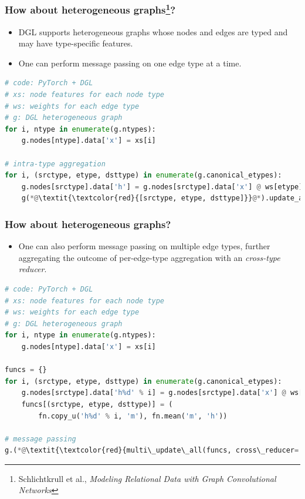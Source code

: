 \documentclass[10pt,aspectratio=169]{beamer}
\begin{document}
	\begin{frame}[fragile]
		\frametitle{How about heterogeneous graphs\footnote{Schlichtkrull et al., \emph{Modeling Relational Data with Graph Convolutional Networks}}?}
		\begin{itemize}
			\item DGL supports heterogeneous graphs whose nodes and edges are typed and may have type-specific features.
			\item One can perform message passing on one edge type at a time.
		\end{itemize}
\begin{lstlisting}[language=Python]
# code: PyTorch + DGL
# xs: node features for each node type
# ws: weights for each edge type
# g: DGL heterogeneous graph
for i, ntype in enumerate(g.ntypes):
    g.nodes[ntype].data['x'] = xs[i]

# intra-type aggregation
for i, (srctype, etype, dsttype) in enumerate(g.canonical_etypes):
    g.nodes[srctype].data['h'] = g.nodes[srctype].data['x'] @ ws[etype]
    g(*@\textit{\textcolor{red}{[srctype, etype, dsttype]}}@*).update_all(fn.copy_u('h', 'm'), fn.mean('m', 'h_%d'))
\end{lstlisting}
	\end{frame}

	\begin{frame}[fragile]
		\frametitle{How about heterogeneous graphs?}
		\begin{itemize}
			\item One can also perform message passing on multiple edge types, further aggregating the outcome of per-edge-type aggregation with an \emph{cross-type reducer}.
		\end{itemize}
\begin{lstlisting}[language=Python]
# code: PyTorch + DGL
# xs: node features for each node type
# ws: weights for each edge type
# g: DGL heterogeneous graph
for i, ntype in enumerate(g.ntypes):
    g.nodes[ntype].data['x'] = xs[i]

funcs = {}
for i, (srctype, etype, dsttype) in enumerate(g.canonical_etypes):
    g.nodes[srctype].data['h%d' % i] = g.nodes[srctype].data['x'] @ ws[etype]
    funcs[(srctype, etype, dsttype)] = (
        fn.copy_u('h%d' % i, 'm'), fn.mean('m', 'h'))

# message passing
g.(*@\textit{\textcolor{red}{multi\_update\_all(funcs, cross\_reducer='sum')}}@*)
\end{lstlisting}
	\end{frame}
\end{document}
